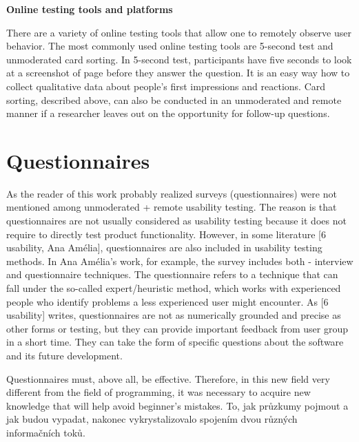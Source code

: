 \documentclass[a4paper,10pt,twoside]{article}
\begin{document}
\noindent \textbf {Online testing tools and platforms}

\noindent There are a variety of online testing tools that allow one to remotely observe user behavior. The most commonly used online testing tools are 5-second test and unmoderated card sorting.  In 5-second test, participants have five seconds to look at a screenshot of page before they answer the question. It is an easy way how to collect qualitative data about people’s first impressions and reactions. Card sorting, described above, can also be conducted in an unmoderated and remote manner if a researcher leaves out on the opportunity for follow-up questions.

\newpage
\vspace*{-1cm}
\section{Questionnaires}
\label{sec:questionnaires}


\noindent As the reader of this work probably realized surveys (questionnaires) were not mentioned among unmoderated + remote usability testing. The reason is that questionnaires are not usually considered as usability testing because it does not require to directly test product functionality. However, in some literature [6 usability, Ana Amélia], questionnaires are also included in usability testing methods. In Ana Amélia's work, for example, the survey includes both - interview and questionnaire techniques. The questionnaire refers to a technique that can fall under the so-called expert/heuristic method, which works with experienced people who identify problems a less experienced user might encounter. As [6 usability] writes, questionnaires are not as numerically grounded and precise as other forms or testing, but they can provide important feedback from user group in a short time. They can take the form of specific questions about the software and its future development. 

Questionnaires must, above all, be effective. Therefore, in this new field very different from the field of programming, it was necessary to acquire new knowledge that will help avoid beginner's mistakes. To, jak průzkumy pojmout a jak budou vypadat, nakonec vykrystalizovalo spojením dvou různých informačních toků.
\end{document}
